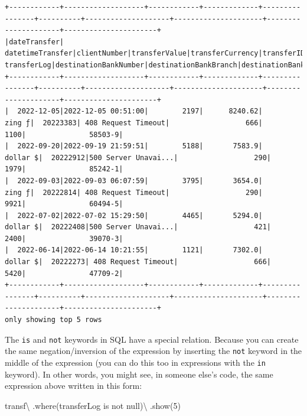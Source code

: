\documentclass[
  11pt,
  letterpaper,
  DIV=11,
  numbers=noendperiod]{scrreprt}
\newenvironment{Shaded}{\begin{snugshade}}{\end{snugshade}}
\newcommand{\DecValTok}[1]{\textcolor[rgb]{0.68,0.00,0.00}{#1}}
\newcommand{\NormalTok}[1]{\textcolor[rgb]{0.00,0.23,0.31}{#1}}
\newcommand{\OperatorTok}[1]{\textcolor[rgb]{0.37,0.37,0.37}{#1}}
\newcommand{\StringTok}[1]{\textcolor[rgb]{0.13,0.47,0.30}{#1}}
\begin{document}
\begin{verbatim}
+------------+-------------------+------------+-------------+----------------+----------+--------------------+---------------------+---------------------+----------------------+
|dateTransfer|   datetimeTransfer|clientNumber|transferValue|transferCurrency|transferID|         transferLog|destinationBankNumber|destinationBankBranch|destinationBankAccount|
+------------+-------------------+------------+-------------+----------------+----------+--------------------+---------------------+---------------------+----------------------+
|  2022-12-05|2022-12-05 00:51:00|        2197|      8240.62|          zing ƒ|  20223383| 408 Request Timeout|                  666|                 1100|               58503-9|
|  2022-09-20|2022-09-19 21:59:51|        5188|       7583.9|        dollar $|  20222912|500 Server Unavai...|                  290|                 1979|               85242-1|
|  2022-09-03|2022-09-03 06:07:59|        3795|       3654.0|          zing ƒ|  20222814| 408 Request Timeout|                  290|                 9921|               60494-5|
|  2022-07-02|2022-07-02 15:29:50|        4465|       5294.0|        dollar $|  20222408|500 Server Unavai...|                  421|                 2400|               39070-3|
|  2022-06-14|2022-06-14 10:21:55|        1121|       7302.0|        dollar $|  20222273| 408 Request Timeout|                  666|                 5420|               47709-2|
+------------+-------------------+------------+-------------+----------------+----------+--------------------+---------------------+---------------------+----------------------+
only showing top 5 rows
\end{verbatim}

The \texttt{is} and \texttt{not} keywords in SQL have a special
relation. Because you can create the same negation/inversion of the
expression by inserting the \texttt{not} keyword in the middle of the
expression (you can do this too in expressions with the \texttt{in}
keyword). In other words, you might see, in someone else's code, the
same expression above written in this form:

\begin{Shaded}
\begin{Highlighting}[]
\NormalTok{transf}\OperatorTok{\textbackslash{}}
\NormalTok{  .where(}\StringTok{\textquotesingle{}transferLog is not null\textquotesingle{}}\NormalTok{)}\OperatorTok{\textbackslash{}}
\NormalTok{  .show(}\DecValTok{5}\NormalTok{)}
\end{Highlighting}
\end{Shaded}
\end{document}

